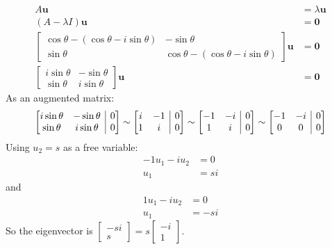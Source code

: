 \documentclass[11pt]{article}
\makeatletter
\newenvironment{amatrix}[1]{%
    \left[\begin{array}{@{}*{#1}{c}|c@{}}
}{%
    \end{array}\right]
}
\makeatother
\begin{document}
\begin{enumerate}[label=\textbf{\arabic*.}, start=2]
{            \begin{align*}
                A\mathbf{u}&=\lambda\mathbf{u} \\
                (A-\lambda I)\mathbf{u}&=\mathbf{0} \\
                \begin{bmatrix}\cos\theta-(\cos\theta-i\sin\theta) & -\sin\theta \\ \sin\theta & \cos\theta-(\cos\theta-i\sin\theta)\end{bmatrix}\mathbf{u}&=\mathbf{0} \\
                \begin{bmatrix}i\sin\theta & -\sin\theta \\ \sin\theta & i\sin\theta\end{bmatrix}\mathbf{u}&=\mathbf{0}
            \end{align*}
            As an augmented matrix:
            \begin{gather*}
                \begin{amatrix}{2}i\sin\theta & -\sin\theta & 0 \\ \sin\theta & i\sin\theta & 0\end{amatrix}
                \sim
                \begin{amatrix}{2}i & -1 & 0 \\ 1 & i & 0\end{amatrix}
                \sim
                \begin{amatrix}{2}-1 & -i & 0 \\ 1 & i & 0\end{amatrix}
                \sim
                \begin{amatrix}{2}-1 & -i & 0 \\ 0 & 0 & 0\end{amatrix}
            \end{gather*}
            Using \(u_2=s\) as a free variable:
            \begin{align*}
                -1u_1-iu_2&=0 \\
                u_1&=si
            \end{align*}
            and
            \begin{align*}
                1u_1-iu_2&=0 \\
                u_1&=-si
            \end{align*}
            So the eigenvector is \(\begin{bmatrix}-si \\ s\end{bmatrix}=s\begin{bmatrix}-i \\ 1\end{bmatrix}\).
        }
    \end{enumerate}
\end{document}
